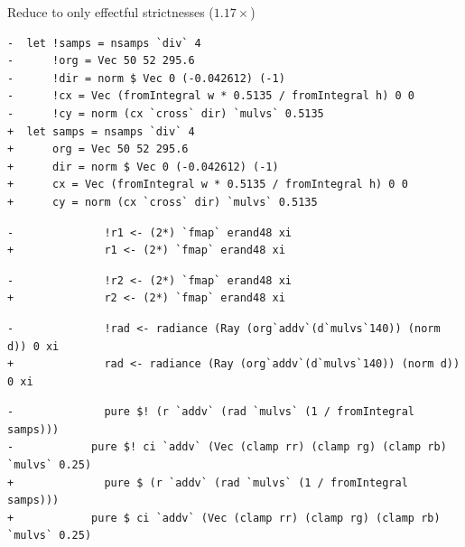 \documentclass[8pt]{beamer}
\begin{document}
\begin{frame}[fragile]{Reduce to only effectful strictnesses ($1.17\times$)}
\begin{verbatim}
-  let !samps = nsamps `div` 4
-      !org = Vec 50 52 295.6
-      !dir = norm $ Vec 0 (-0.042612) (-1)
-      !cx = Vec (fromIntegral w * 0.5135 / fromIntegral h) 0 0
-      !cy = norm (cx `cross` dir) `mulvs` 0.5135
+  let samps = nsamps `div` 4
+      org = Vec 50 52 295.6
+      dir = norm $ Vec 0 (-0.042612) (-1)
+      cx = Vec (fromIntegral w * 0.5135 / fromIntegral h) 0 0
+      cy = norm (cx `cross` dir) `mulvs` 0.5135
\end{verbatim}
\begin{verbatim}
-              !r1 <- (2*) `fmap` erand48 xi
+              r1 <- (2*) `fmap` erand48 xi
\end{verbatim}

\begin{verbatim}
-              !r2 <- (2*) `fmap` erand48 xi
+              r2 <- (2*) `fmap` erand48 xi
\end{verbatim}

\begin{verbatim}
-              !rad <- radiance (Ray (org`addv`(d`mulvs`140)) (norm d)) 0 xi
+              rad <- radiance (Ray (org`addv`(d`mulvs`140)) (norm d)) 0 xi
\end{verbatim}

\begin{verbatim}
-              pure $! (r `addv` (rad `mulvs` (1 / fromIntegral samps)))
-            pure $! ci `addv` (Vec (clamp rr) (clamp rg) (clamp rb) `mulvs` 0.25)
+              pure $ (r `addv` (rad `mulvs` (1 / fromIntegral samps)))
+            pure $ ci `addv` (Vec (clamp rr) (clamp rg) (clamp rb) `mulvs` 0.25)
\end{verbatim}

\end{frame}

\end{document}
